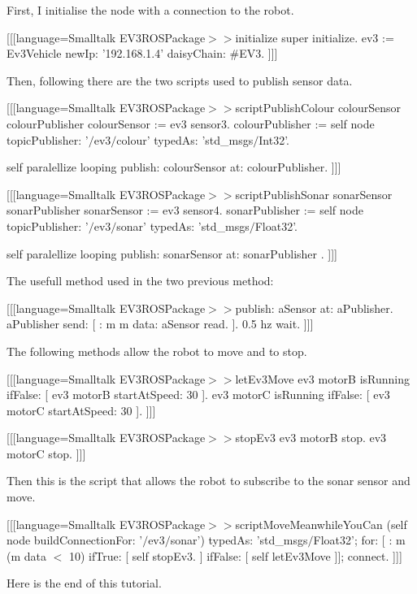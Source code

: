 \documentclass[a4paper,10pt,twoside]{book}
\begin{document}
First, I initialise the node with a connection to the robot.

{[}{[}{[}language=Smalltalk
EV3ROSPackage$>$$>$initialize
  super initialize.
  ev3 := Ev3Vehicle newIp: '192.168.1.4' daisyChain: \#EV3.
{]}{]}{]}

Then, following there are the two scripts used to publish sensor data.

{[}{[}{[}language=Smalltalk
EV3ROSPackage$>$$>$scriptPublishColour
  \textbar{} colourSensor colourPublisher \textbar{}
  colourSensor := ev3 sensor3.
  colourPublisher := self node topicPublisher: '$/$ev3$/$colour' typedAs: 'std\_msgs$/$Int32'.

  self paralellize looping publish: colourSensor at: colourPublisher.
{]}{]}{]}

{[}{[}{[}language=Smalltalk
EV3ROSPackage$>$$>$scriptPublishSonar
  \textbar{} sonarSensor sonarPublisher \textbar{}
  sonarSensor := ev3 sensor4.
  sonarPublisher := self node topicPublisher: '$/$ev3$/$sonar' typedAs: 'std\_msgs$/$Float32'.

  self paralellize looping publish: sonarSensor at: sonarPublisher .
{]}{]}{]}

The usefull method used in the two previous method:

{[}{[}{[}language=Smalltalk
EV3ROSPackage$>$$>$publish: aSensor at: aPublisher.
  aPublisher send: {[} : m \textbar{}
    m data: aSensor read.
   {]}.
  0.5 hz wait.
{]}{]}{]}

The following methods allow the robot to move and to stop.

{[}{[}{[}language=Smalltalk
EV3ROSPackage$>$$>$letEv3Move
  ev3 motorB isRunning ifFalse: {[} ev3 motorB startAtSpeed: 30 {]}.
  ev3 motorC isRunning ifFalse: {[} ev3 motorC startAtSpeed: 30 {]}.
{]}{]}{]}

{[}{[}{[}language=Smalltalk
EV3ROSPackage$>$$>$stopEv3
  ev3 motorB stop.
  ev3 motorC stop.
{]}{]}{]}


Then this is the script that allows the robot to subscribe to the sonar sensor and move.

{[}{[}{[}language=Smalltalk
EV3ROSPackage$>$$>$scriptMoveMeanwhileYouCan
  (self node buildConnectionFor: '$/$ev3$/$sonar')
      typedAs: 'std\_msgs$/$Float32';
      for: {[} : m \textbar{}  (m data $<$ 10) ifTrue: {[}  self stopEv3.  {]}  ifFalse: {[} self letEv3Move {]}{]};
      connect.
{]}{]}{]}

Here is the end of this tutorial.



\ifx\wholebook\relax\else
   
\end{document}
